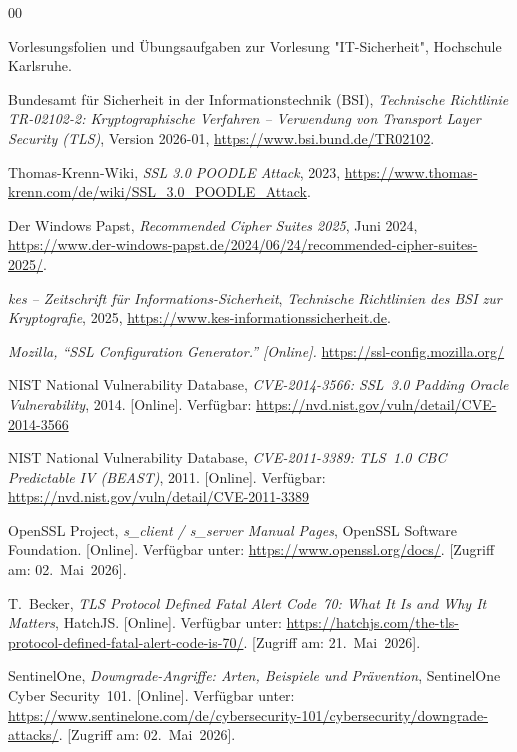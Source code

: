 \begin{thebibliography}{00}

  Vorlesungsfolien und Übungsaufgaben zur Vorlesung "IT-Sicherheit", Hochschule Karlsruhe.


  Bundesamt für Sicherheit in der Informationstechnik (BSI),
  \textit{Technische Richtlinie TR-02102-2: Kryptographische Verfahren --
  Verwendung von Transport Layer Security (TLS)}, Version 2026-01,
  \url{https://www.bsi.bund.de/TR02102}.

  Thomas-Krenn-Wiki,
  \textit{SSL 3.0 POODLE Attack}, 2023,
  \url{https://www.thomas-krenn.com/de/wiki/SSL_3.0_POODLE_Attack}.

  Der Windows Papst,
  \textit{Recommended Cipher Suites 2025}, Juni 2024,
  \url{https://www.der-windows-papst.de/2024/06/24/recommended-cipher-suites-2025/}.

  \textit{kes -- Zeitschrift für Informations-Sicherheit},
  \textit{Technische Richtlinien des BSI zur Kryptografie}, 2025,
  \url{https://www.kes-informationssicherheit.de}.


  \textit{Mozilla, ``SSL Configuration Generator.'' [Online].}
  \url{https://ssl-config.mozilla.org/}

  NIST National Vulnerability Database,
  \textit{CVE-2014-3566: SSL~3.0 Padding Oracle Vulnerability},
  2014.
  [Online]. Verfügbar:
  \url{https://nvd.nist.gov/vuln/detail/CVE-2014-3566}

  NIST National Vulnerability Database,
  \textit{CVE-2011-3389: TLS~1.0 CBC Predictable IV (BEAST)},
  2011.
  [Online]. Verfügbar:
  \url{https://nvd.nist.gov/vuln/detail/CVE-2011-3389}


  OpenSSL Project,
  \textit{s\_client / s\_server Manual Pages},
  OpenSSL Software Foundation.
  [Online]. Verfügbar unter: \url{https://www.openssl.org/docs/}.
  [Zugriff am: 02.~Mai~2026].

  T.~Becker,
  \textit{TLS Protocol Defined Fatal Alert Code~70: What It Is and
  Why It Matters},
  HatchJS.
  [Online]. Verfügbar unter:
  \url{https://hatchjs.com/the-tls-protocol-defined-fatal-alert-code-is-70/}.
  [Zugriff am: 21.~Mai~2026].

  SentinelOne,
  \textit{Downgrade-Angriffe: Arten, Beispiele und Prävention},
  SentinelOne Cyber Security~101.
  [Online]. Verfügbar unter:
  \url{https://www.sentinelone.com/de/cybersecurity-101/cybersecurity/downgrade-attacks/}.
  [Zugriff am: 02.~Mai~2026].


\end{thebibliography}
